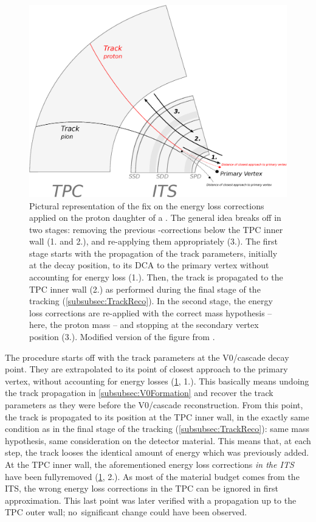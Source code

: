 \begin{figure}[t]
	\centering
	\includegraphics[width=1\textwidth]{Figs/Chapter5/Schema-RetroCorrections.eps}
	\caption{Pictural representation of the fix on the energy loss corrections applied on the proton daughter of a \rmLambdaPM. The general idea breaks off in two stages: removing the previous \dEdx-corrections below the TPC inner wall (1. and 2.), and re-applying them appropriately (3.). The first stage starts with the propagation of the track parameters, initially at the decay position, to its DCA to the primary vertex without accounting for energy loss (1.). Then, the track is propagated to the TPC inner wall (2.) as performed during the final stage of the tracking (\Sec\ref{subsubsec:TrackReco}). In the second stage, the energy loss corrections are re-applied with the correct mass hypothesis -- here, the proton mass -- and stopping at the secondary vertex position (3.). Modified version of the figure from \cite{maireTrackReconstructionPrinciple2011}.}
	\label{fig:SchemeRetroCorrection}
\end{figure}

The procedure starts off with the track parameters at the V0/cascade decay point. They are extrapolated to its point of closest approach to the primary vertex, without accounting for energy losses (\fig\ref{fig:SchemeRetroCorrection}, 1.). This basically means undoing the track propagation in \Sec\ref{subsubsec:V0Formation} and recover the track parameters as they were before the V0/cascade reconstruction. From this point, the track is propagated to its position at the TPC inner wall, in the exactly same condition as in the final stage of the tracking (\Sec\ref{subsubsec:TrackReco}): same mass hypothesis, same consideration on the detector material. This means that, at each step, the track looses the identical amount of energy which was previously added. At the TPC inner wall, the aforementioned energy loss corrections \textit{in the ITS} have been fully\break removed (\fig\ref{fig:SchemeRetroCorrection}, 2.). As most of the material budget comes from the ITS, the wrong energy loss corrections in the TPC can be ignored in first approximation. This last point was later verified with a propagation up to the TPC outer wall; no~significant change could have been observed.  

